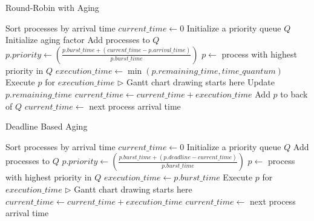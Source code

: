 \documentclass{article}
\begin{document}
\begin{algorithm}
\caption{Round-Robin with Aging}
\begin{algorithmic}[1]
\State Sort processes by arrival time
\State $current\_time \gets 0$
\State Initialize a priority queue $Q$
\State Initialize aging factor
        \State Add processes to $Q$
    \EndWhile
        \State $p.priority \gets \left(\frac{p.burst\_time + (current\_time - p.arrival\_time)}{p.burst\_time}\right)$
    \EndFor
        \State $p \gets$ process with highest priority in $Q$
        \State $execution\_time \gets \min(p.remaining\_time, time\_quantum)$
        \State Execute $p$ for $execution\_time$ $\triangleright$ Gantt chart drawing starts here
        \State Update $p.remaining\_time$
        \State $current\_time \gets current\_time + execution\_time$
            \State Add $p$ to back of $Q$
        \EndIf
    \Else
        \State $current\_time \gets$ next process arrival time
    \EndIf
\EndWhile
\end{algorithmic}
\end{algorithm}

\begin{algorithm}
\caption{Deadline Based Aging}
\begin{algorithmic}[1]
\State Sort processes by arrival time
\State $current\_time \gets 0$
\State Initialize a priority queue $Q$
        \State Add processes to $Q$
    \EndWhile
        \State $p.priority \gets \left(\frac{p.burst\_time + (p.deadline - current\_time)}{p.burst\_time}\right)$
    \EndFor
        \State $p \gets$ process with highest priority in $Q$
        \State $execution\_time \gets p.burst\_time$
        \State Execute $p$ for $execution\_time$ $\triangleright$ Gantt chart drawing starts here
        \State $current\_time \gets current\_time + execution\_time$
    \Else
        \State $current\_time \gets$ next process arrival time
    \EndIf
\EndWhile
\end{algorithmic}
\end{algorithm}
\end{document}

